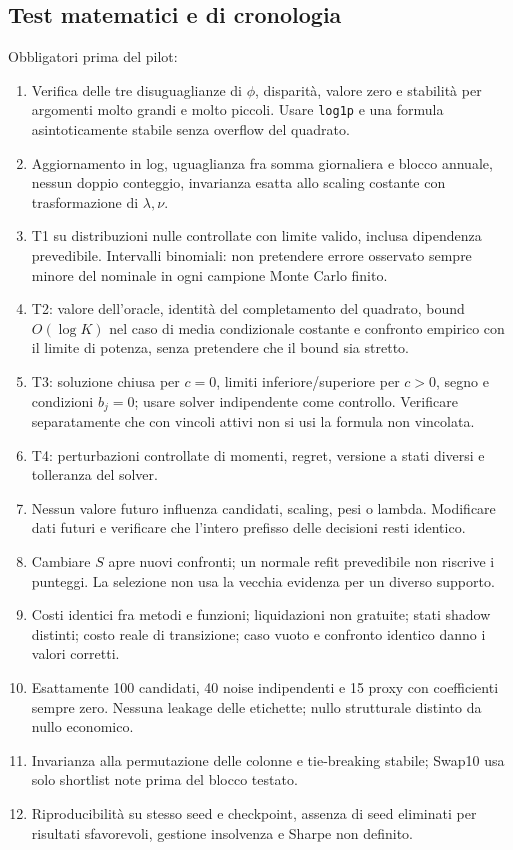 \documentclass[11pt,a4paper]{article}
\theoremstyle{definition}\newtheorem{definition}[theorem]{Definizione}
\theoremstyle{remark}\newtheorem{remark}[theorem]{Osservazione}
\begin{document}
\subsection{Test matematici e di cronologia}
Obbligatori prima del pilot:
\begin{enumerate}
\item Verifica delle tre disuguaglianze di $\phi$, disparità, valore zero e stabilità per argomenti molto grandi e molto piccoli. Usare \texttt{log1p} e una formula asintoticamente stabile senza overflow del quadrato.
\item Aggiornamento in log, uguaglianza fra somma giornaliera e blocco annuale, nessun doppio conteggio, invarianza esatta allo scaling costante con trasformazione di $\lambda,\nu$.
\item T1 su distribuzioni nulle controllate con limite valido, inclusa dipendenza prevedibile. Intervalli binomiali: non pretendere errore osservato sempre minore del nominale in ogni campione Monte Carlo finito.
\item T2: valore dell'oracle, identità del completamento del quadrato, bound $O(\log K)$ nel caso di media condizionale costante e confronto empirico con il limite di potenza, senza pretendere che il bound sia stretto.
\item T3: soluzione chiusa per $c=0$, limiti inferiore/superiore per $c>0$, segno e condizioni $b_j=0$; usare solver indipendente come controllo. Verificare separatamente che con vincoli attivi non si usi la formula non vincolata.
\item T4: perturbazioni controllate di momenti, regret, versione a stati diversi e tolleranza del solver.
\item Nessun valore futuro influenza candidati, scaling, pesi o lambda. Modificare dati futuri e verificare che l'intero prefisso delle decisioni resti identico.
\item Cambiare $S$ apre nuovi confronti; un normale refit prevedibile non riscrive i punteggi. La selezione non usa la vecchia evidenza per un diverso supporto.
\item Costi identici fra metodi e funzioni; liquidazioni non gratuite; stati shadow distinti; costo reale di transizione; caso vuoto e confronto identico danno i valori corretti.
\item Esattamente 100 candidati, 40 noise indipendenti e 15 proxy con coefficienti sempre zero. Nessuna leakage delle etichette; nullo strutturale distinto da nullo economico.
\item Invarianza alla permutazione delle colonne e tie-breaking stabile; Swap10 usa solo shortlist note prima del blocco testato.
\item Riproducibilità su stesso seed e checkpoint, assenza di seed eliminati per risultati sfavorevoli, gestione insolvenza e Sharpe non definito.
\end{enumerate}
\end{document}
